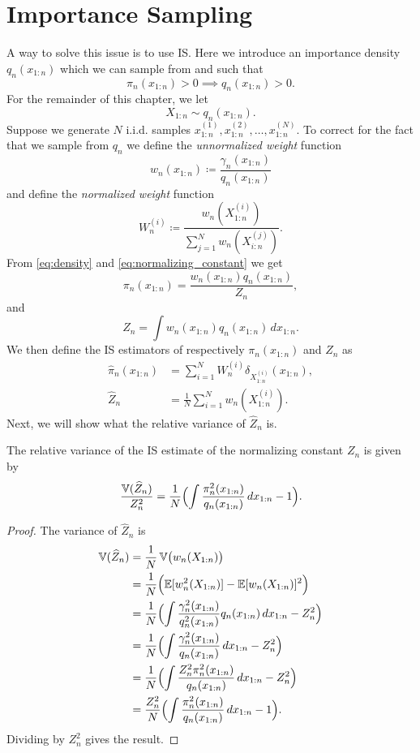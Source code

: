 \section{Importance Sampling}
A way to solve this issue is to use \gls*{IS}. Here we introduce an importance density $q_n(x_{1:n})$ which we can sample from and such that 
\[
\pi_n(x_{1:n})>0 \implies q_n(x_{1:n})>0.
\]
For the remainder of this chapter, we let 
\[
	X_{1:n} \sim q_n(x_{1:n}).
\]
Suppose we generate $N$ i.i.d. samples $x_{1:n}^{(1)},x_{1:n}^{(2)},\dots,x_{1:n}^{(N)}$. 
To correct for the fact that we sample from $q_n$ we define the \emph{unnormalized weight} function
\[
w_n(x_{1:n}) \coloneq \frac{\gamma_n(x_{1:n})}{q_n(x_{1:n})}
\]
and define the \emph{normalized weight} function
\[
W_n^{(i)} \coloneq \frac{w_n(X_{1:n}^{(i)})}{\sum_{j=1}^N w_n(X_{i:n}^{(j)})}.
\]
From \cref{eq:density} and \cref{eq:normalizing_constant} we get
\begin{equation}
	\pi_n(x_{1:n})=\frac{w_n(x_{1:n})q_n(x_{1:n})}{Z_n},
\end{equation}
and
\begin{equation}
	Z_n=\int w_n(x_{1:n})q_n(x_{1:n})\, dx_{1:n}.
\end{equation}
We then define the \gls*{IS} estimators of respectively $\pi_n(x_{1:n})$ and $Z_n$ as
\begin{align}
	\widehat{\pi}_n(x_{1:n}) &= \sum_{i=1}^{N}W_n^{(i)} \delta_{X_{1:n}^{(i)}}(x_{1:n}), \label{eq:est_pi} \\
	\widehat{Z}_n &= \frac{1}{N}\sum_{i=1}^{N}w_n(X_{1:n}^{(i)}). \label{eq:est_Z}
\end{align}
Next, we will show what the relative variance of $\widehat{Z}_n$ is.
\begin{theorem}
	\label{thm:rel_var_Z_IS}
	The relative variance of the \gls*{IS} estimate of the  normalizing constant $Z_n$ is given by
	\[
	\frac{\operatorname{\mathbb{V}}(\widehat{Z}_n)}{Z_n^2}=\frac{1}{N}\Bigl(\int \frac{\pi_n^2(x_{1:n})}{q_n(x_{1:n})}\, dx_{1:n}-1\Bigr).
	\]
\end{theorem}
\begin{proof}
	The variance of $\widehat{Z}_n$ is 
	\begin{align*}
		\operatorname{\mathbb{V}}(\widehat{Z}_n)&=\frac{1}{N}\operatorname{\mathbb{V}}\bigl(w_n(X_{1:n})\bigr) \\
		&=\frac{1}{N}\Bigl(\operatorname{\mathbb{E}}[w_n^2(X_{1:n})]-\operatorname{\mathbb{E}}[w_n(X_{1:n})]^2\Bigr) \\
		&=\frac{1}{N}\Bigl(\int \frac{\gamma_n^2(x_{1:n})}{q_n^2(x_{1:n})} q_n(x_{1:n})\, dx_{1:n}-Z_n^2\Bigr) \\
		&=\frac{1}{N}\Bigl(\int \frac{\gamma_n^2(x_{1:n})}{q_n(x_{1:n})}\, dx_{1:n}-Z_n^2\Bigr) \\
		&=\frac{1}{N}\Bigl(\int \frac{Z_n^2\pi_n^2(x_{1:n})}{q_n(x_{1:n})}\, dx_{1:n}-Z_n^2\Bigr) \\
		&=\frac{Z_n^2}{N}\Bigl(\int \frac{\pi_n^2(x_{1:n})}{q_n(x_{1:n})}\, dx_{1:n}-1\Bigr).
	\end{align*}
	Dividing by $Z_n^2$ gives the result.
\end{proof}
